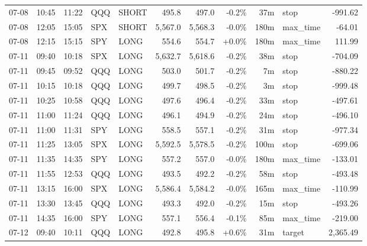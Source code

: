 \documentclass[11pt,a4paper,twoside]{article}
\begin{document}
\begin{center}
\begin{longtable}{>{\color{txtmain}}l l l l l r r r r >{\color{txtmain}}l r}
07-08 & 10:45 & 11:22 & QQQ & SHORT & 495.8 & 497.0 & \textcolor{lossred}{-0.2\%} & 37m & stop & \textcolor{lossred}{-991.62} \\
07-08 & 12:05 & 15:05 & SPX & SHORT & 5,567.0 & 5,568.3 & \textcolor{lossred}{-0.0\%} & 180m & max\_time & \textcolor{lossred}{-64.01} \\
07-08 & 12:15 & 15:15 & SPY & LONG & 554.6 & 554.7 & \textcolor{wingreen}{+0.0\%} & 180m & max\_time & \textcolor{wingreen}{111.99} \\
07-11 & 09:40 & 10:18 & SPX & LONG & 5,632.7 & 5,618.6 & \textcolor{lossred}{-0.2\%} & 38m & stop & \textcolor{lossred}{-704.09} \\
07-11 & 09:45 & 09:52 & QQQ & LONG & 503.0 & 501.7 & \textcolor{lossred}{-0.2\%} & 7m & stop & \textcolor{lossred}{-880.22} \\
07-11 & 10:15 & 10:18 & QQQ & LONG & 499.7 & 498.5 & \textcolor{lossred}{-0.2\%} & 3m & stop & \textcolor{lossred}{-999.48} \\
07-11 & 10:25 & 10:58 & QQQ & LONG & 497.6 & 496.4 & \textcolor{lossred}{-0.2\%} & 33m & stop & \textcolor{lossred}{-497.61} \\
07-11 & 11:00 & 11:24 & QQQ & LONG & 496.1 & 494.9 & \textcolor{lossred}{-0.2\%} & 24m & stop & \textcolor{lossred}{-496.10} \\
07-11 & 11:00 & 11:31 & SPY & LONG & 558.5 & 557.1 & \textcolor{lossred}{-0.2\%} & 31m & stop & \textcolor{lossred}{-977.34} \\
07-11 & 11:25 & 13:05 & SPX & LONG & 5,592.5 & 5,578.5 & \textcolor{lossred}{-0.2\%} & 100m & stop & \textcolor{lossred}{-699.06} \\
07-11 & 11:35 & 14:35 & SPY & LONG & 557.2 & 557.0 & \textcolor{lossred}{-0.0\%} & 180m & max\_time & \textcolor{lossred}{-133.01} \\
07-11 & 11:55 & 12:53 & QQQ & LONG & 493.5 & 492.2 & \textcolor{lossred}{-0.2\%} & 58m & stop & \textcolor{lossred}{-493.48} \\
07-11 & 13:15 & 16:00 & SPX & LONG & 5,586.4 & 5,584.2 & \textcolor{lossred}{-0.0\%} & 165m & max\_time & \textcolor{lossred}{-110.99} \\
07-11 & 13:30 & 13:45 & QQQ & LONG & 493.3 & 492.0 & \textcolor{lossred}{-0.2\%} & 15m & stop & \textcolor{lossred}{-493.26} \\
07-11 & 14:35 & 16:00 & SPY & LONG & 557.1 & 556.4 & \textcolor{lossred}{-0.1\%} & 85m & max\_time & \textcolor{lossred}{-219.00} \\
07-12 & 09:40 & 10:11 & QQQ & LONG & 492.8 & 495.8 & \textcolor{wingreen}{+0.6\%} & 31m & target & \textcolor{wingreen}{2,365.49} \\

\end{longtable}
\end{center}
\end{document}

